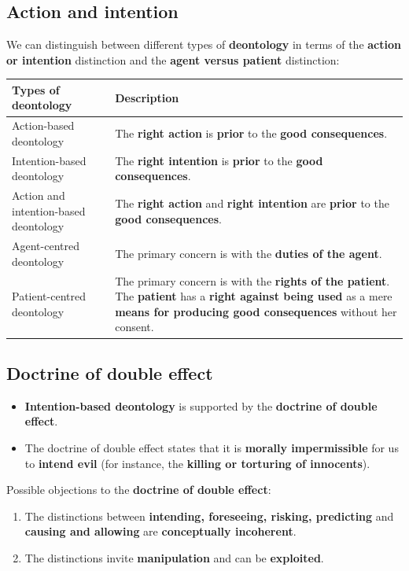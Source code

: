 \documentclass[11pt]{article}
\begin{document}
\subsection{Action and intention}
\label{sec:org0008b5b}
We can distinguish between different types of \textbf{deontology} in terms of the \textbf{action or intention} distinction and the \textbf{agent versus patient} distinction:

\begin{center}
\begin{tabularx}{\textwidth}{|X|X|}
\hline
Types of deontology & Description\\
\hline
Action-based deontology & The \textbf{right action} is \textbf{prior} to the \textbf{good consequences}.\\
\hline
Intention-based deontology & The \textbf{right intention} is \textbf{prior} to the \textbf{good consequences}.\\
\hline
Action and intention-based deontology & The \textbf{right action} and \textbf{right intention} are \textbf{prior} to the \textbf{good consequences}.\\
\hline
Agent-centred deontology & The primary concern is with the \textbf{duties of the agent}.\\
\hline
Patient-centred deontology & The primary concern is with the \textbf{rights of the patient}. The \textbf{patient} has a \textbf{right against being used} as a mere \textbf{means for producing good consequences} without her consent.\\
\hline
\end{tabularx}
\end{center}
\subsection{Doctrine of double effect}
\label{sec:org3936517}
\begin{itemize}
\item \textbf{Intention-based deontology} is supported by the \textbf{doctrine of double effect}.
\item The doctrine of double effect states that it is \textbf{morally impermissible} for us to \textbf{intend evil} (for instance, the \textbf{killing or torturing of innocents}).
\end{itemize}

Possible objections to the \textbf{doctrine of double effect}:
\begin{enumerate}
\item The distinctions between \textbf{intending, foreseeing, risking, predicting} and \textbf{causing and allowing} are \textbf{conceptually incoherent}.
\item The distinctions invite \textbf{manipulation} and can be \textbf{exploited}.
\end{enumerate}
\end{document}
